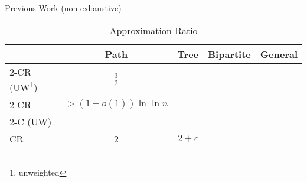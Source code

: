 \begin{frame}{Previous Work (non exhaustive)}
\begin{table}
\caption{Approximation Ratio}
\begin{tabular}{|l|c|c|c|c|}


\hline	
 											& 
Path 										& 
Tree										& 
Bipartite									& 
General										\\


\hline
2-CR (UW\footnote{\label{uw}unweighted})
											& 
$\frac{3}{2}$								&					
											&		
											&		
											\\

\hline
2-CR 										& 
$> (1 - o(1))\ln\ln{n}$						&					
											&
											&
											\\

\hline
2-C (UW)									&	 
											&					
											&
											&
											\\

\hline
CR											& 
2											& 
$2 + \epsilon$								&		
											&
											\\	

\hline	


\end{tabular}
\end{table}
\end{frame}